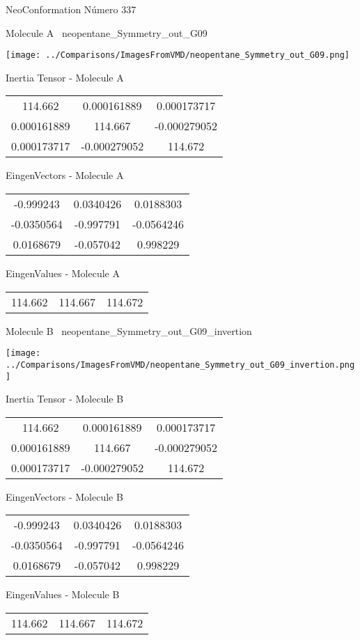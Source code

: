 \vtab[-3cm]
\begin{center}
{\large NeoConformation \tab Número 337}
\end{center}
\begin{multicols}{2}
\begin{center}

Molecule A \
neopentane\_Symmetry\_out\_G09

\texttt{[image: ../Comparisons/ImagesFromVMD/neopentane\_Symmetry\_out\_G09.png]}

Inertia Tensor - Molecule A \\
\begin{tabular}{|c c c|}
114.662	 & 	0.000161889	 & 	0.000173717	 \\
0.000161889	 & 	114.667	 & 	-0.000279052	 \\
0.000173717	 & 	-0.000279052	 & 	114.672
\end{tabular}

\vtab
 EingenVectors - Molecule A     \\
\begin{tabular}{|c c c|}
-0.999243	 & 	0.0340426	 & 	0.0188303	 \\
-0.0350564	 & 	-0.997791	 & 	-0.0564246	 \\
0.0168679	 & 	-0.057042	 & 	0.998229
\end{tabular}

\vtab
 EingenValues - Molecule A     \\
\begin{tabular}{|c c c|}
114.662	 & 	114.667	 & 	114.672	 \\
\end{tabular}
\columnbreak

Molecule B \
neopentane\_Symmetry\_out\_G09\_invertion

\texttt{[image: ../Comparisons/ImagesFromVMD/neopentane\_Symmetry\_out\_G09\_invertion.png]}

Inertia Tensor - Molecule B \\
\begin{tabular}{|c c c|}
114.662	 & 	0.000161889	 & 	0.000173717	 \\
0.000161889	 & 	114.667	 & 	-0.000279052	 \\
0.000173717	 & 	-0.000279052	 & 	114.672
\end{tabular}

\vtab
 EingenVectors - Molecule B     \\
\begin{tabular}{|c c c|}
-0.999243	 & 	0.0340426	 & 	0.0188303	 \\
-0.0350564	 & 	-0.997791	 & 	-0.0564246	 \\
0.0168679	 & 	-0.057042	 & 	0.998229
\end{tabular}

\vtab
 EingenValues - Molecule B     \\
\begin{tabular}{|c c c|}
114.662	 & 	114.667	 & 	114.672	 \\
\end{tabular}

\end{center}
\end{multicols}

